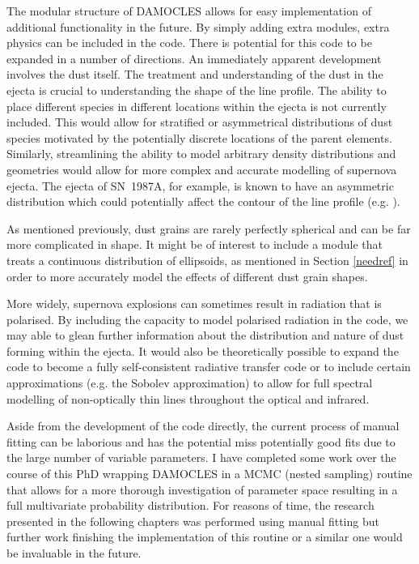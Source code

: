 The modular structure of DAMOCLES allows for easy implementation of additional functionality in the future.  By simply adding extra modules, extra physics can be included in the code.  There is potential for this code to be expanded in a number of directions.  An immediately apparent development involves the dust itself.  The treatment and understanding of the dust in the ejecta is crucial to understanding the shape of the line profile.  The ability to place different species in different locations within the ejecta is not currently included.  This would allow for stratified or asymmetrical distributions of dust species motivated by the potentially discrete locations of the parent elements.  Similarly, streamlining the ability to model arbitrary density distributions and geometries would allow for more complex and accurate modelling of supernova ejecta.  The ejecta of SN~1987A, for example, is known to have an asymmetric distribution which could potentially affect the contour of the line profile (e.g. \citet{Sinnott2013}).

As mentioned previously, dust grains are rarely perfectly spherical and can be far more complicated in shape.  It might be of interest to include a module that treats a continuous distribution of ellipsoids, as mentioned in Section \ref{needref} in order to more accurately model the effects of different dust grain shapes.

More widely, supernova explosions can sometimes result in radiation that is polarised.  By including the capacity to model polarised radiation in the code, we may able to glean further information about the distribution and nature of dust forming within the ejecta.  It would also be theoretically possible to expand the code to become a fully self-consistent radiative transfer code or to include certain approximations (e.g. the Sobolev approximation) to allow for full spectral modelling of non-optically thin lines throughout the optical and infrared.

Aside from the development of the code directly, the current process of manual fitting can be laborious and has the potential miss potentially good fits due to the large number of variable parameters.  I have completed some work over the course of this PhD wrapping DAMOCLES in a MCMC (nested sampling) routine that allows for a more thorough investigation of parameter space resulting in a full multivariate probability distribution.  For reasons of time, the research presented in the following chapters was performed using manual fitting but further work finishing the implementation of this routine or a similar one would be invaluable in the future.





